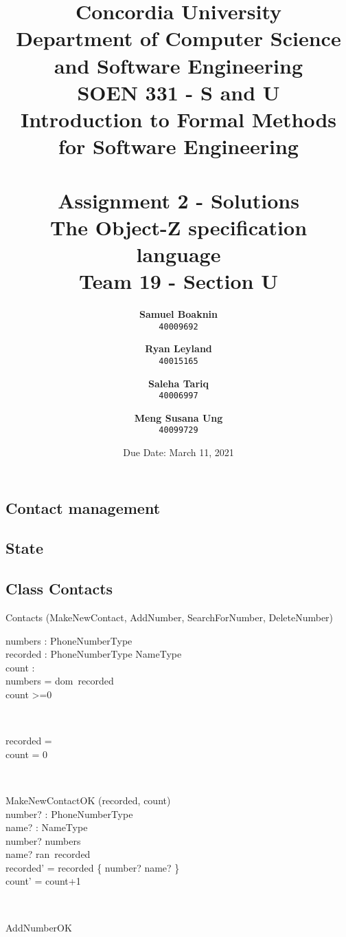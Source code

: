 \documentclass[12pt]{article}
\title{Concordia University\\
Department of Computer Science and Software Engineering\\
\textbf{SOEN 331 - S and U\\Introduction to Formal Methods\\for Software Engineering}\\
\ \\
\textbf{Assignment 2 - Solutions}\\
The Object-Z specification language\\
\textbf{Team 19 - Section U}}
\author{
	\textbf{Samuel Boaknin}\\
	\texttt{40009692}
	\and
	\textbf{Ryan Leyland}\\
	\texttt{40015165}
	\and
	\textbf{Saleha Tariq}\\
	\texttt{40006997}
	\and
	\textbf{Meng Susana Ung}\\
	\texttt{40099729}
}
\date{Due Date: March 11, 2021}
\begin{document}
\begin{spacing}{1.5}

\maketitle

\newpage

\section{Contact management}
\subsection{State}
\newpage
\subsection{Class Contacts}
\begin{class}{Contacts}
\also
\upharpoonright (MakeNewContact, AddNumber, SearchForNumber, DeleteNumber) \\
\begin{state}
numbers :  PhoneNumberType\\
recorded : PhoneNumberType \pfun NameType\\
count :   \\
\where
numbers = dom~recorded \\
count >=0 \\
\end{state} \\
\begin{init}
recorded = \emptyset \\ %
count = 0 \\
\end{init} \\
\begin{op}{MakeNewContactOK}
\Delta (recorded, count) \\
number? : PhoneNumberType\\
name? : NameType\\
\ST
number? \notin numbers\\
name? \notin ran~recorded\\
recorded' = recorded \cup \{ number? \mapsto name? \} \\
count' = count+1 \\
\end{op}\\
\begin{op}{AddNumberOK}

\end{op}
\end{class}
\end{spacing}
\end{document}
